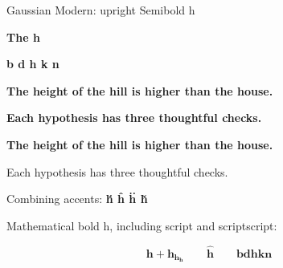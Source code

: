 \documentclass[12pt]{article}
\begin{document}
\noindent Gaussian Modern: upright Semibold h\par
\bigskip
{\bfseries\fontsize{96}{110}\selectfont The h\par}
\bigskip
{\bfseries\fontsize{40}{48}\selectfont b d h k n\par}
\bigskip
\noindent\textbf{The height of the hill is higher than the house.}\par
\noindent\textbf{Each hypothesis has three thoughtful checks.}\par
\bigskip
{\bfseries\fontsize{10}{14}\selectfont
\noindent The height of the hill is higher than the house.\par
\noindent Each hypothesis has three thoughtful checks.\par}
\bigskip
\noindent Combining accents: \textbf{h́ ĥ ḧ ȟ}\par
\bigskip
\noindent Mathematical bold h, including script and scriptscript:\par
\[
  \symbf{h} + \symbf{h}_{\symbf{h}_{\symbf{h}}}
  \qquad \hat{\symbf{h}} \qquad \symbf{b d h k n}
\]
\end{document}
